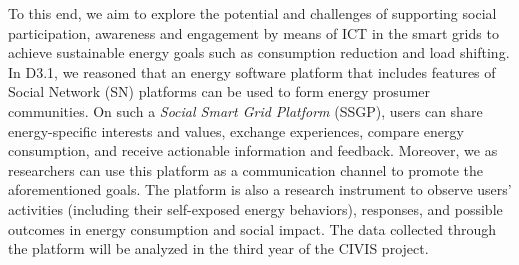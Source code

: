 To this end, we aim to explore the potential and challenges of supporting social participation, awareness and engagement by means of ICT in the smart grids to achieve sustainable energy goals such as consumption reduction and load shifting. In D3.1, we reasoned that an energy software platform that includes features of Social Network (SN) platforms can be used to form energy prosumer communities. 
% 
On such a \textit{Social Smart Grid Platform} (SSGP), users can share energy-specific interests and values, exchange experiences,  compare energy consumption, and receive actionable information and feedback. 
%
Moreover, we as researchers can use this platform as a communication channel to promote the aforementioned goals. The platform is also a research instrument to observe users' activities (including their self-exposed energy behaviors), responses, and possible outcomes in energy consumption and social impact.  The data collected through the platform will be analyzed in the third year of the CIVIS project.  

